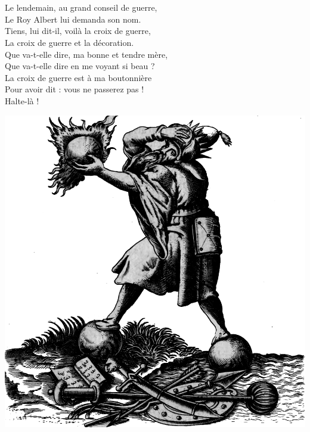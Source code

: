 \breakpage
\\\\Le lendemain, au grand conseil de guerre,
\\Le Roy Albert lui demanda son nom.
\\Tiens, lui dit-il, voilà la croix de guerre,
\\La croix de guerre et la décoration.
\\Que va-t-elle dire, ma bonne et tendre mère,
\\Que va-t-elle dire en me voyant si beau ?
\\La croix de guerre est à ma boutonnière
\\Pour avoir dit : vous ne passerez pas ! \bissimple
\\Halte-là !
\bigskip
\bigskip
\begin{center}
\centering
    \includegraphics[width=1\textwidth]{images/brev57.png}
 \end{center}

\breakpage